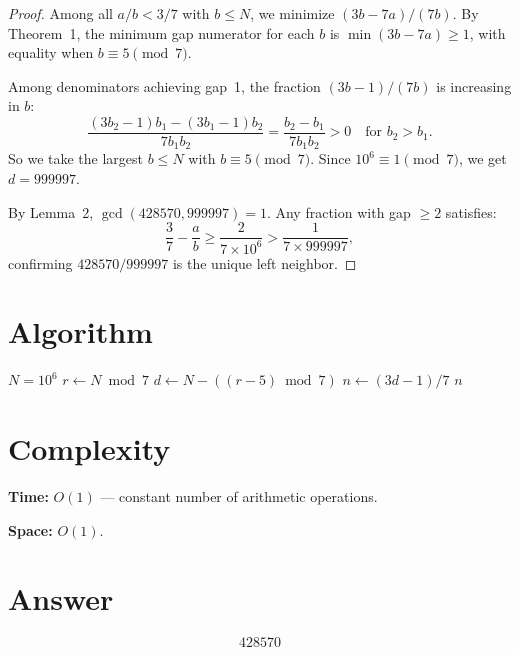 \documentclass[12pt,a4paper]{article}
\begin{document}
\begin{proof}
Among all $a/b < 3/7$ with $b \leq N$, we minimize $(3b - 7a)/(7b)$. By Theorem~1, the minimum gap numerator for each $b$ is $\min(3b - 7a) \geq 1$, with equality when $b \equiv 5 \pmod{7}$.

Among denominators achieving gap~1, the fraction $(3b-1)/(7b)$ is increasing in $b$:
\[
\frac{(3b_2 - 1)b_1 - (3b_1 - 1)b_2}{7b_1 b_2} = \frac{b_2 - b_1}{7b_1 b_2} > 0 \quad \text{for } b_2 > b_1.
\]
So we take the largest $b \leq N$ with $b \equiv 5 \pmod{7}$. Since $10^6 \equiv 1 \pmod{7}$, we get $d = 999997$.

By Lemma~2, $\gcd(428570, 999997) = 1$. Any fraction with gap $\geq 2$ satisfies:
\[
\frac{3}{7} - \frac{a}{b} \geq \frac{2}{7 \times 10^6} > \frac{1}{7 \times 999997},
\]
confirming $428570/999997$ is the unique left neighbor.
\end{proof}

\section{Algorithm}

\begin{algorithm}[H]
\caption{Closed-form computation}
\begin{algorithmic}[1]
\Require $N = 10^6$
\State $r \gets N \bmod 7$
\State $d \gets N - ((r - 5) \bmod 7)$ 
\State $n \gets (3d - 1) / 7$
\State \Return $n$
\end{algorithmic}
\end{algorithm}

\section{Complexity}

\textbf{Time:} $O(1)$ --- constant number of arithmetic operations.

\textbf{Space:} $O(1)$.

\section{Answer}

\[
\boxed{428570}
\]
\end{document}
